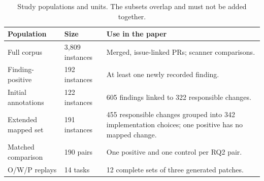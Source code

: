 \documentclass[acmsmall,screen,nonacm]{acmart}
\begin{document}
\begin{table}[H]
\caption{Study populations and units. The subsets overlap and must not be added together.}
\label{tab:population-guide}
\footnotesize\renewcommand{\arraystretch}{1.10}
\begin{tabularx}{\linewidth}{@{}L{2.65cm}L{2.2cm}Y@{}}
\toprule
\textbf{Population} & \textbf{Size} & \textbf{Use in the paper}\\
\midrule
Full corpus & 3,809 instances & Merged, issue-linked PRs; scanner comparisons.\\
Finding-positive & 192 instances & At least one newly recorded finding.\\
Initial annotations & 122 instances & 605 findings linked to 322 responsible changes.\\
Extended mapped set & 191 instances & 455 responsible changes grouped into 342 implementation choices; one positive has no mapped change.\\
Matched comparison & 190 pairs & One positive and one control per RQ2 pair.\\
O/W/P replays & 14 tasks & 12 complete sets of three generated patches.\\
\bottomrule
\end{tabularx}
\end{table}
\end{document}

